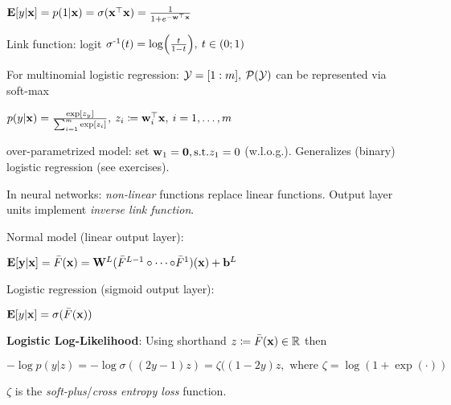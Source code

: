     \tab$\mathbf E{\lbrack}y|\mathbf x\rbrack=p(1|\mathbf x)=\sigma(\mathbf x^{\mathop{\mathrm{\top}}}\mathbf x)=\frac{1}{1+e^{-\mathbf w^{\mathop{\mathrm{\top}}}\mathbf x}}$
    
    Link function: logit $\sigma^{\text{-}1}(t)=\log(\frac{t}{1-t}),\>t\in(0;1)$
    
    For multinomial logistic regression: $\mathcal{Y}=\lbrack1:m\rbrack,\>\mathcal{P}(\mathcal{Y})$ can be represented via soft-max
    
    \tab$p(y|\mathbf x)=\frac{\exp\lbrack z_y\rbrack}{\sum_{i=1}^m\exp\lbrack z_i\rbrack},\>z_i\coloneqq\mathbf w_i^{\mathop{\mathrm{\top}}}\mathbf x,\>i=1,\ldots,m$
    
    over-parametrized model: set $\mathbf w_1=\mathbf{0}, \text{s.t.} z_1=0$ (w.l.o.g.). Generalizes (binary) logistic regression (see exercises).
    
    In neural networks: \emph{non-linear} functions replace linear functions. Output layer units implement \emph{inverse link function}.
    
    Normal model (linear output layer):
    
    \tab$\mathbf E\lbrack\mathbf y|\mathbf x\rbrack=\bar{F}(\mathbf x)=\mathbf W^L(\bar{F}^{L-1}\circ\cdots{\circ}\bar{F}^1)(\mathbf x)+\mathbf b^L$
    
    Logistic regression (sigmoid output layer):
    
    \tab$\mathbf E\lbrack y|\mathbf x\rbrack=\sigma(\bar{F}(\mathbf x))$
    
    \textbf{Logistic Log-Likelihood}: Using shorthand $z\coloneqq\bar{F}(\mathbf x)\in\mathbb R$ then
    
    \tab$-\log p(y|z)=-\log\sigma((2y-1)z)=\zeta((1-2y)z, \text{ where } \zeta=\log(1+\exp(\cdot))$
    
    $\zeta$ is the \emph{soft-plus}/\emph{cross entropy loss} function.
 